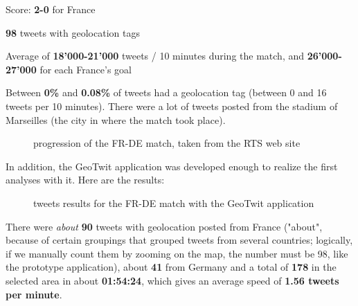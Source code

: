 \documentclass[a4paper,11pt]{report}
\begin{document}
\begin{itemize}
{		\vspace{40pt}
		Score: \textbf{2-0} for France
		
		\vspace{5pt}
		\textbf{98} tweets with geolocation tags
		
		\vspace{5pt}
		Average of \textbf{18'000-21'000} tweets / 10 minutes during the match, and \textbf{26'000-27'000} for each France's goal
		
		\vspace{5pt}
		Between \textbf{0\%} and \textbf{0.08\%} of tweets had a geolocation tag (between 0 and 16 tweets per 10 minutes). There were a lot of tweets posted from the stadium of Marseilles (the city in where the match took place).
	}
	\begin{figure}[H]
	\vspace{-5pt}
	\begin{center}
	\vspace{-5pt}
	\caption{progression of the FR-DE match, taken from the RTS web site}
	\end{center}
	\end{figure}
	\vspace{-20pt}	
	In addition, the GeoTwit application was developed enough to realize the first analyses with it. Here are the results:
	\begin{figure}[H]
	\vspace{-5pt}
	\begin{center}
	\vspace{-5pt}
	\caption{tweets results for the FR-DE match with the GeoTwit application}
	\end{center}
	\end{figure}
	\vspace{-20pt}
	There were \textit{about} \textbf{90} tweets with geolocation posted from France ("about", because of certain groupings that grouped tweets from several countries; logically, if we manually count them by zooming on the map, the number must be 98, like the prototype application), about \textbf{41} from Germany and a total of \textbf{178} in the selected area in about \textbf{01:54:24}, which gives an average speed of \textbf{1.56 tweets per minute}.
	\newpage	
	

\end{itemize}
\end{document}
